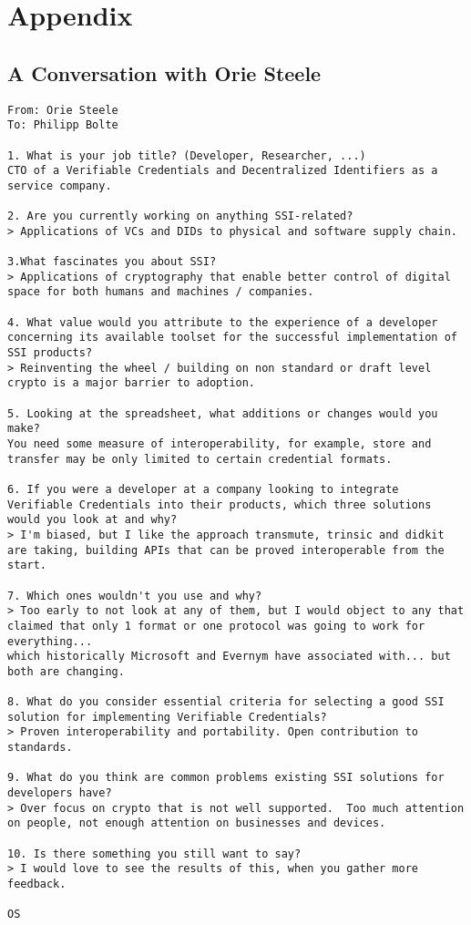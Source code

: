 \appendix
\cleardoublepage
{}
\newpage
\lhead{}
\rhead{\leftmark}
\chapter*{Appendix}

\section*{A Conversation with Orie Steele}\label{appendix: steele}
\begin{Verbatim}[breaklines=true, breaksymbol={}, breaksymbolsepleftnchars=2]
From: Orie Steele
To: Philipp Bolte

1. What is your job title? (Developer, Researcher, ...)
CTO of a Verifiable Credentials and Decentralized Identifiers as a service company.
 
2. Are you currently working on anything SSI-related?
> Applications of VCs and DIDs to physical and software supply chain.
 
3.What fascinates you about SSI?
> Applications of cryptography that enable better control of digital space for both humans and machines / companies.
 
4. What value would you attribute to the experience of a developer concerning its available toolset for the successful implementation of SSI products?
> Reinventing the wheel / building on non standard or draft level crypto is a major barrier to adoption.
 
5. Looking at the spreadsheet, what additions or changes would you make?
You need some measure of interoperability, for example, store and transfer may be only limited to certain credential formats.
 
6. If you were a developer at a company looking to integrate Verifiable Credentials into their products, which three solutions would you look at and why?
> I'm biased, but I like the approach transmute, trinsic and didkit are taking, building APIs that can be proved interoperable from the start.
 
7. Which ones wouldn't you use and why?
> Too early to not look at any of them, but I would object to any that claimed that only 1 format or one protocol was going to work for everything... 
which historically Microsoft and Evernym have associated with... but both are changing.
 
8. What do you consider essential criteria for selecting a good SSI solution for implementing Verifiable Credentials?
> Proven interoperability and portability. Open contribution to standards. 
 
9. What do you think are common problems existing SSI solutions for developers have? 
> Over focus on crypto that is not well supported.  Too much attention on people, not enough attention on businesses and devices.
 
10. Is there something you still want to say?
> I would love to see the results of this, when you gather more feedback.

OS
\end{Verbatim}

